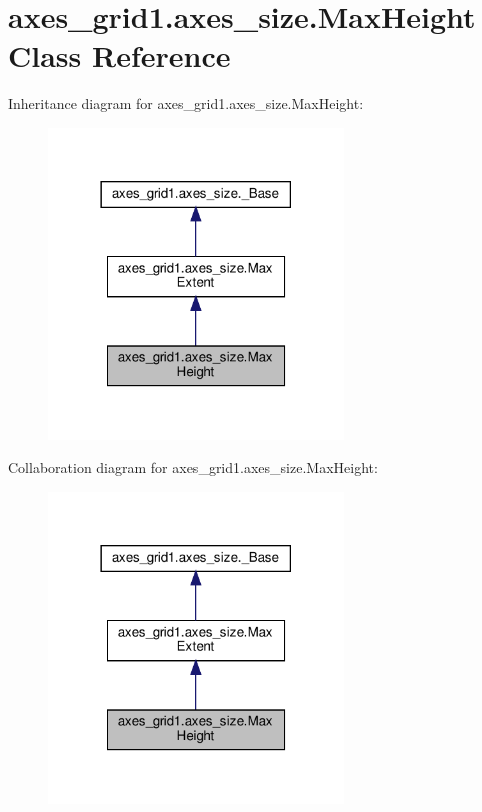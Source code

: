 \hypertarget{classaxes__grid1_1_1axes__size_1_1MaxHeight}{}\section{axes\+\_\+grid1.\+axes\+\_\+size.\+Max\+Height Class Reference}
\label{classaxes__grid1_1_1axes__size_1_1MaxHeight}


Inheritance diagram for axes\+\_\+grid1.\+axes\+\_\+size.\+Max\+Height\+:
\nopagebreak
\begin{figure}[H]
\begin{center}
\leavevmode
\includegraphics[width=222pt]{classaxes__grid1_1_1axes__size_1_1MaxHeight__inherit__graph}
\end{center}
\end{figure}


Collaboration diagram for axes\+\_\+grid1.\+axes\+\_\+size.\+Max\+Height\+:
\nopagebreak
\begin{figure}[H]
\begin{center}
\leavevmode
\includegraphics[width=222pt]{classaxes__grid1_1_1axes__size_1_1MaxHeight__coll__graph}
\end{center}
\end{figure}
